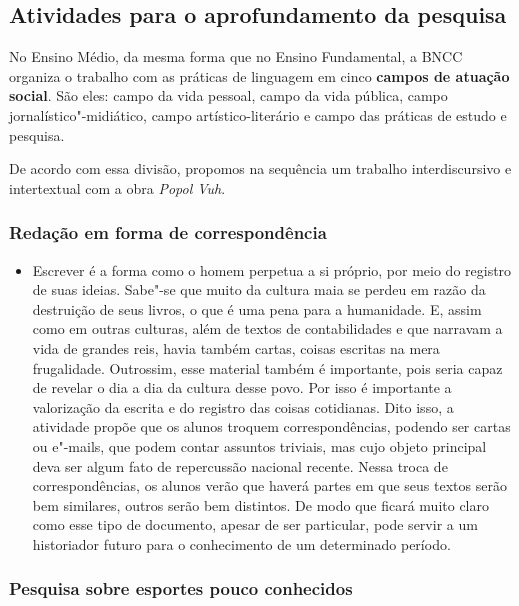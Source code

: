 \documentclass[12pt]{extarticle}
\begin{document}


\subsection{Atividades para o aprofundamento da pesquisa}

No Ensino Médio, da mesma forma que no Ensino Fundamental, a BNCC
organiza o trabalho com as práticas de linguagem em cinco \textbf{campos
de atuação social}. São eles: campo da vida pessoal, campo da vida
pública, campo jornalístico"-midiático, campo artístico-literário e campo
das práticas de estudo e pesquisa.

De acordo com essa divisão, propomos na sequência um trabalho
interdiscursivo e intertextual com a obra \emph{Popol Vuh}.

\subsubsection{Redação em forma de correspondência}


\begin{itemize}
\item
  Escrever é a forma como o homem perpetua a si próprio, por meio do
  registro de suas ideias. Sabe"-se que muito da cultura maia se perdeu
  em razão da destruição de seus livros, o que é uma pena para a
  humanidade. E, assim como em outras culturas, além de textos de
  contabilidades e que narravam a vida de grandes reis, havia também
  cartas, coisas escritas na mera frugalidade. Outrossim, esse material
  também é importante, pois seria capaz de revelar o dia a dia da
  cultura desse povo. Por isso é importante a valorização da escrita e
  do registro das coisas cotidianas. Dito isso, a atividade propõe que
  os alunos troquem correspondências, podendo ser cartas ou e"-mails, que
  podem contar assuntos triviais, mas cujo objeto principal deva ser
  algum fato de repercussão nacional recente. Nessa troca de
  correspondências, os alunos verão que haverá partes em que seus textos
  serão bem similares, outros serão bem distintos. De modo que ficará
  muito claro como esse tipo de documento, apesar de ser particular,
  pode servir a um historiador futuro para o conhecimento de um
  determinado período.
\end{itemize}

\subsubsection{Pesquisa sobre esportes pouco conhecidos}
\end{document}
